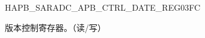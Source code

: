 \begin{register}{H}{APB\_SARADC\_APB\_CTRL\_DATE\_REG}{\hexprefix{}03FC}\label{regdesc:APBSARADCAPBCTRLDATEREG}
%
\regnewline%
\begin{regdesc}\begin{reglist}
\label{fielddesc:APBSARADCAPBCTRLDATE}\item [APB\_SARADC\_APB\_CTRL\_DATE] 版本控制寄存器。（读/写）
\end{reglist}\end{regdesc}
\end{register}


